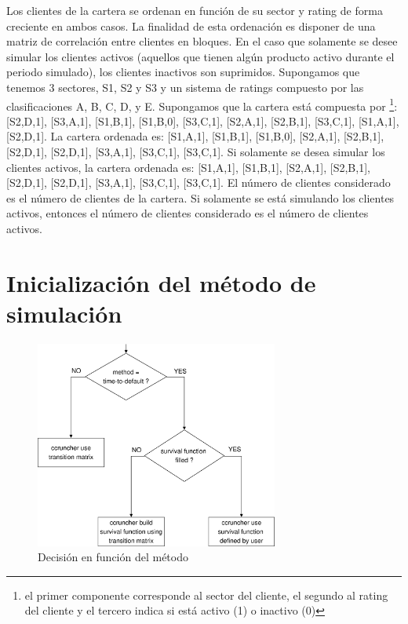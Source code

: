 Los clientes de la cartera se ordenan en funci\'on de su sector
y rating de forma creciente en ambos casos. La finalidad de esta
ordenaci\'on es disponer de una matriz de correlaci\'on entre
clientes en bloques. En el caso que solamente se desee simular
los clientes activos (aquellos que tienen alg\'un producto activo
durante el periodo simulado), los clientes inactivos son
suprimidos.
\newline
\newline
Supongamos que tenemos 3 sectores, S1, S2 y S3 y un sistema de
ratings compuesto por las clasificaciones A, B, C, D, y E.
Supongamos que la cartera est\'a compuesta por \footnote{el
primer componente corresponde al sector del cliente, el segundo al
rating del cliente y el tercero indica si est\'a activo (1) o inactivo (0)}:
[S2,D,1], [S3,A,1], [S1,B,1], [S1,B,0], [S3,C,1], [S2,A,1], [S2,B,1], [S3,C,1],
[S1,A,1], [S2,D,1].
\newline
\newline
La cartera ordenada es:
[S1,A,1], [S1,B,1], [S1,B,0], [S2,A,1], [S2,B,1], [S2,D,1], [S2,D,1],
[S3,A,1], [S3,C,1], [S3,C,1].
\newline
\newline
Si solamente se desea simular los clientes activos, la cartera ordenada es:
[S1,A,1], [S1,B,1], [S2,A,1], [S2,B,1], [S2,D,1], [S2,D,1], [S3,A,1],
[S3,C,1], [S3,C,1].
\newline
\newline
El n\'umero de clientes considerado es el n\'umero de clientes de la cartera.
Si solamente se est\'a simulando los clientes activos, entonces el n\'umero
de clientes considerado es el n\'umero de clientes activos.


\section{Inicializaci\'on del m\'etodo de simulaci\'on}

\begin{figure}[!hb]
\begin{center}
\includegraphics[width=8cm,angle=0]{./images/decisiontree1.eps}
\caption{Decisi\'on en funci\'on del m\'etodo}
\label{decisiontree1}
\end{center}
\end{figure}


